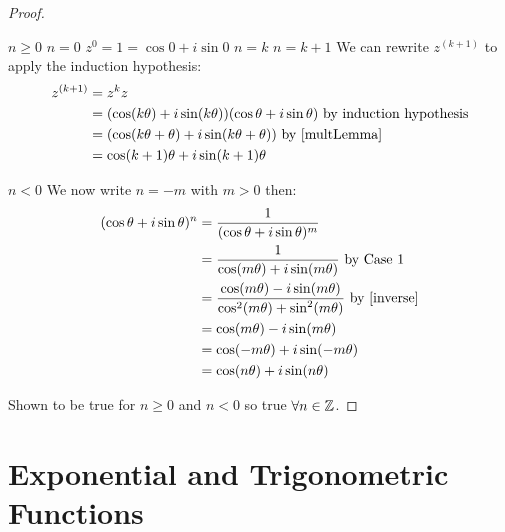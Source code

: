 \documentclass[../main.tex]{subfiles}
\begin{document}
\begin{proof}
  \begin{proofcases}
    \begin{case}{$n \geq 0$}
      \induction
      {$n = 0$}{
        $z^0 = 1 = \cos 0 + i \sin 0$ \tick
      }
      {$n = k$}{}
      {$n = k + 1$}{
        We can rewrite $z^{(k + 1)}$ to apply the induction hypothesis:
        \begin{align*}
          z^{(k+1)} &= z^k z \\
                    &= (\cos(k\theta) + i\sin(k\theta))(\cos \theta + i\sin \theta) \text{ by induction hypothesis}\\
                    &= (\cos(k\theta + \theta) + i\sin(k\theta + \theta)) \text{ by \cref{multLemma}}\\
                    &= \cos(k + 1)\theta + i \sin(k + 1)\theta
        \end{align*}
      }
    \end{case}
    \begin{case}{$n < 0$}
      We now write $n = -m$ with $m > 0$ then:
      \begin{align*}
        (\cos \theta + i \sin \theta)^n &= \frac{1}{(\cos \theta + i \sin \theta)^m} \\
                                        &= \frac{1}{\cos(m\theta) + i\sin(m\theta)} \text{ by Case 1}\\
                                        &= \frac{\cos(m\theta) - i\sin(m\theta)}{\cos^2(m\theta) + \sin^2(m\theta)} \text{ by \cref{inverse}}\\
                                        &= \cos(m\theta) - i\sin(m\theta) \\
                                        &= \cos(-m\theta) + i\sin(-m\theta) \\
                                        &= \cos(n\theta) + i\sin(n\theta)
      \end{align*}
    \end{case}
  \end{proofcases}
  Shown to be true for $n \geq 0$ and $n < 0$ so true $\forall n \in \mathbb{Z}$.
\end{proof}
\section{Exponential and Trigonometric Functions}
\end{document}
